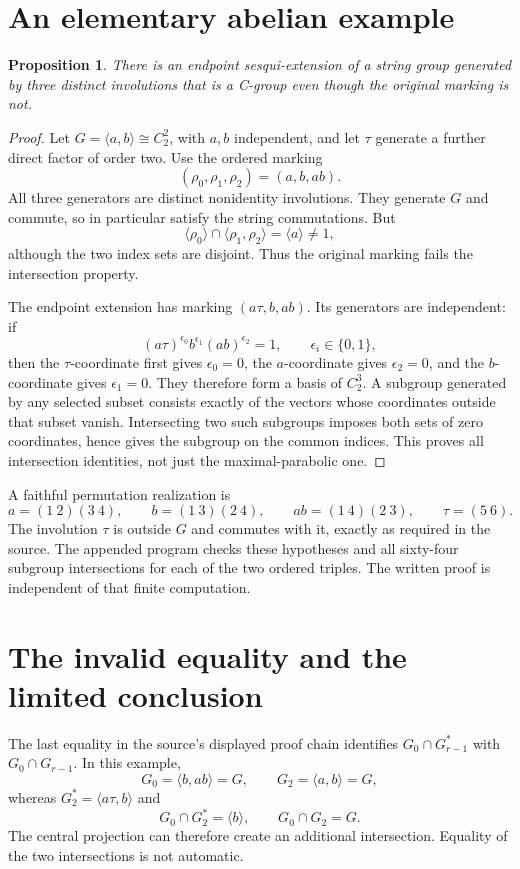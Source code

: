 \documentclass[11pt,a4paper]{article}
\newtheorem{proposition}{Proposition}\newcommand{\gen}[1]{\langle#1\rangle}
\begin{document}
\section{An elementary abelian example}
\begin{proposition}
There is an endpoint sesqui-extension of a string group generated by three distinct involutions that is a C-group even though the original marking is not.
\end{proposition}
\begin{proof}
Let $G=\gen{a,b}\cong C_2^2$, with $a,b$ independent, and let $\tau$ generate a further direct factor of order two. Use the ordered marking
\[
 (\rho_0,\rho_1,\rho_2)=(a,b,ab).
\]
All three generators are distinct nonidentity involutions. They generate $G$ and commute, so in particular satisfy the string commutations. But
\[
 \gen{\rho_0}\cap\gen{\rho_1,\rho_2}
 =\gen{a}\ne 1,
\]
although the two index sets are disjoint. Thus the original marking fails the intersection property.

The endpoint extension has marking $(a\tau,b,ab)$. Its generators are independent: if
\[
 (a\tau)^{\epsilon_0}b^{\epsilon_1}(ab)^{\epsilon_2}=1,
 \qquad \epsilon_i\in\{0,1\},
\]
then the $\tau$-coordinate first gives $\epsilon_0=0$, the $a$-coordinate gives $\epsilon_2=0$, and the $b$-coordinate gives $\epsilon_1=0$. They therefore form a basis of $C_2^3$. A subgroup generated by any selected subset consists exactly of the vectors whose coordinates outside that subset vanish. Intersecting two such subgroups imposes both sets of zero coordinates, hence gives the subgroup on the common indices. This proves all intersection identities, not just the maximal-parabolic one.
\end{proof}

A faithful permutation realization is
\[
 a=(1\ 2)(3\ 4),\qquad b=(1\ 3)(2\ 4),\qquad
 ab=(1\ 4)(2\ 3),\qquad \tau=(5\ 6).
\]
The involution $\tau$ is outside $G$ and commutes with it, exactly as required in the source. The appended program checks these hypotheses and all sixty-four subgroup intersections for each of the two ordered triples. The written proof is independent of that finite computation.

\section{The invalid equality and the limited conclusion}
The last equality in the source's displayed proof chain identifies $G_0\cap G^*_{r-1}$ with $G_0\cap G_{r-1}$. In this example,
\[
 G_0=\gen{b,ab}=G,\qquad G_{2}=\gen{a,b}=G,
\]
whereas $G^*_{2}=\gen{a\tau,b}$ and
\[
 G_0\cap G^*_{2}=\gen{b},\qquad G_0\cap G_{2}=G.
\]
The central projection can therefore create an additional intersection. Equality of the two intersections is not automatic.
\end{document}
